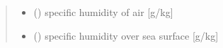 \documentclass[letterpaper,10pt,english]{sphinxmanual}
\begin{document}
\begin{fulllineitems}
\begin{quote}
\begin{description}
\sphinxAtStartPar
\begin{itemize}
\item {}
\sphinxAtStartPar
{} () \textendash{} specific humidity of air {[}g/kg{]}

\item {}
\sphinxAtStartPar
{} () \textendash{} specific humidity over sea surface {[}g/kg{]}

\end{itemize}


\end{description}\end{quote}

\end{fulllineitems}

\end{document}
